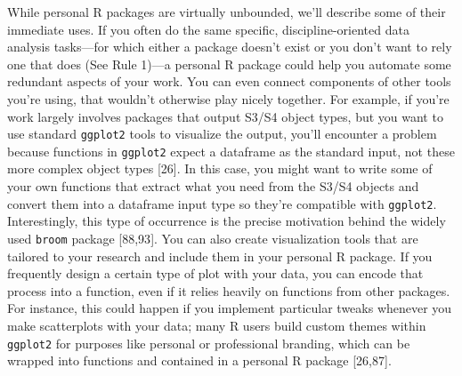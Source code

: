 \documentclass[10pt,letterpaper]{article}
\begin{document}
While personal R packages are virtually unbounded, we'll describe some
of their immediate uses. If you often do the same specific,
discipline-oriented data analysis tasks---for which either a package
doesn't exist or you don't want to rely one that does (See Rule 1)---a
personal R package could help you automate some redundant aspects of
your work. You can even connect components of other tools you're using,
that wouldn't otherwise play nicely together. For example, if you're
work largely involves packages that output S3/S4 object types, but you
want to use standard \texttt{ggplot2} tools to visualize the output,
you'll encounter a problem because functions in \texttt{ggplot2} expect
a dataframe as the standard input, not these more complex object types
{[}26{]}. In this case, you might want to write some of your own
functions that extract what you need from the S3/S4 objects and convert
them into a dataframe input type so they're compatible with
\texttt{ggplot2}. Interestingly, this type of occurrence is the precise
motivation behind the widely used \texttt{broom} package {[}88,93{]}.
You can also create visualization tools that are tailored to your
research and include them in your personal R package. If you frequently
design a certain type of plot with your data, you can encode that
process into a function, even if it relies heavily on functions from
other packages. For instance, this could happen if you implement
particular tweaks whenever you make scatterplots with your data; many R
users build custom themes within \texttt{ggplot2} for purposes like
personal or professional branding, which can be wrapped into functions
and contained in a personal R package {[}26,87{]}.
\end{document}
